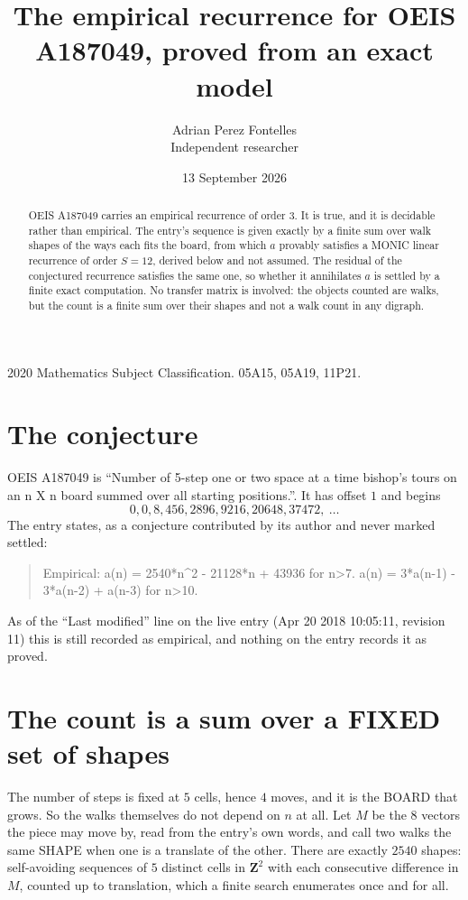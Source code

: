 \documentclass[11pt,a4paper]{article}
\title{The empirical recurrence for OEIS A187049, proved from an exact model}
\author{Adrian Perez Fontelles\\ \small Independent researcher}
\date{13 September 2026}
\theoremstyle{plain}
\theoremstyle{definition}
\begin{document}
\maketitle

\begin{abstract}
OEIS A187049 carries an empirical recurrence of order $3$. It is true, and it is
decidable rather than empirical. The entry's sequence is given exactly by a finite sum over walk shapes of the ways each fits the board, from
which $a$ provably satisfies a MONIC linear recurrence of order $S=12$, derived below and not
assumed. The residual of the conjectured recurrence satisfies the same one, so whether it
annihilates $a$ is settled by a finite exact computation. No transfer matrix is involved: the objects counted are walks, but the count is a finite sum over their shapes and not a walk count in any digraph.
\end{abstract}

\noindent\small 2020 Mathematics Subject Classification. 05A15, 05A19, 11P21.\normalsize

\section{The conjecture}

OEIS A187049 is ``Number of 5-step one or two space at a time bishop's tours on an n X n board summed over all starting positions.''. It has offset $1$ and begins
\[
0, 0, 8, 456, 2896, 9216, 20648, 37472,\ \dots
\]
The entry states, as a conjecture contributed by its author and never marked settled:
\begin{quote}
Empirical: a(n) = 2540*n\^{}2 - 21128*n + 43936 for n>7. a(n) = 3*a(n-1) - 3*a(n-2) + a(n-3) for n>10.
\end{quote}
As of the ``Last modified'' line on the live entry (Apr 20 2018 10:05:11, revision 11)
this is still recorded as empirical, and nothing on the entry records it as proved.

\section{The count is a sum over a FIXED set of shapes}

The number of steps is fixed at $5$ cells, hence $4$ moves, and it is the BOARD
that grows. So the walks themselves do not depend on $n$ at all. Let $M$ be the $8$
vectors the piece may move by, read from the entry's own words, and call two walks the same
SHAPE when one is a translate of the other. There are exactly $2540$ shapes: self-avoiding
sequences of $5$ distinct cells in $\mathbf{Z}^{2}$ with each consecutive difference in
$M$, counted up to translation, which a finite search enumerates once and for all.
\end{document}
